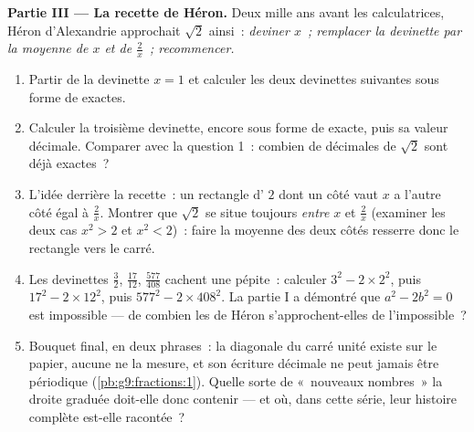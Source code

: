 \begin{problem}
\medskip
\noindent\textbf{Partie III --- La recette de Héron.}
Deux mille ans avant les calculatrices, Héron d'Alexandrie approchait
$\sqrt2$ ainsi~: \emph{deviner $x$~; remplacer la devinette par la
moyenne de $x$ et de $\frac2x$~; recommencer.}
\begin{enumerate}[resume]
  \item Partir de la devinette $x = 1$ et calculer les deux
        devinettes suivantes sous forme de  exactes.
  \item Calculer la troisième devinette, encore sous forme de
         exacte, puis sa valeur décimale. Comparer avec la
        question 1~: combien de décimales de $\sqrt2$ sont déjà
        exactes~?
  \item L'idée derrière la recette~: un rectangle d' $2$ dont un
        côté vaut $x$ a l'autre côté égal à $\frac2x$. Montrer que
        $\sqrt2$ se situe toujours \emph{entre} $x$ et $\frac2x$
        (examiner les deux cas $x^2 > 2$ et $x^2 < 2$)~: faire la
        moyenne des deux côtés resserre donc le rectangle vers le
        carré.
  \item Les devinettes $\frac32$, $\frac{17}{12}$,
        $\frac{577}{408}$ cachent une pépite~: calculer
        $3^2 - 2 \times 2^2$, puis $17^2 - 2 \times 12^2$, puis
        $577^2 - 2 \times 408^2$. La partie I a démontré que
        $a^2 - 2b^2 = 0$ est impossible --- de combien les 
        de Héron s'approchent-elles de l'impossible~?
  \item Bouquet final, en deux phrases~: la diagonale du carré unité
        existe sur le papier, aucune  ne la mesure, et son
        écriture décimale ne peut jamais être périodique
        (\cref{pb:g9:fractions:1}). Quelle sorte de «~nouveaux
        nombres~» la droite graduée doit-elle donc contenir --- et
        où, dans cette série, leur histoire complète est-elle
        racontée~?
\end{enumerate}
\end{problem}
